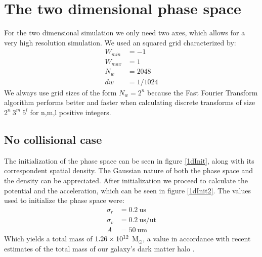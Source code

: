 \section{The two dimensional phase space}

For the two dimensional simulation we only need two axes, which allows for a very high resolution simulation. We used an squared grid characterized by:
\begin{align}
W_{min} &= -1\\
W_{max} &= 1\\
N_w &= 2048\\
dw &= 1/1024
\end{align}
We always use grid sizes of the form $N_w = 2^n$ because the Fast Fourier Transform algorithm performs better and faster when calculating discrete transforms of size $2^n \ 3^m \ 5^l$ for n,m,l positive integers.%
\subsection{No collisional case}
The initialization of the phase space can be seen in figure \ref{1dInit}, along with its correspondent spatial density.
The Gaussian nature of both the phase space and the density can be appreciated. 
After initialization we proceed to calculate the potential and the acceleration, which can be seen in figure \ref{1dInit2}.
The values used to initialize the phase space were:
\begin{align}
\sigma_r &= 0.2 \ \text{us} \\
\sigma_v &= 0.2 \ \text{us} / \text{ut} \\
A &= 50  \ \text{um}
\end{align}
Which yields a total mass of $1.26\times 10^{12}$ M$_{\odot}$, a value in accordance with recent estimates of the total mass of our galaxy's dark matter halo \cite{2013JCAP07016N}. %


